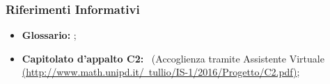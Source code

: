\documentclass[../PianoDiQualifica.tex]{subfiles}
\begin{document}
		\subsubsection{Riferimenti Informativi}	
		\begin{itemize}
			\item \textbf{Glossario:} \glossariov;
			\item\textbf{Capitolato d'appalto C2:} \progetto\ (Accoglienza tramite Assistente Virtuale \href{http://www.math.unipd.it/~tullio/IS-1/2016/Progetto/C2.pdf}{(http://www.math.unipd.it/~tullio/IS-1/2016/Progetto/C2.pdf)};
		\end{itemize}
			
\end{document}
